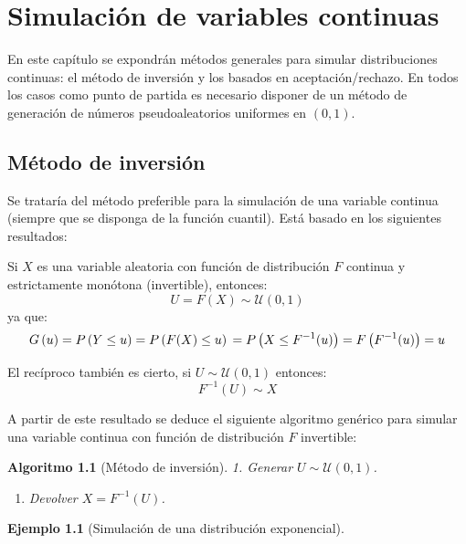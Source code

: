 \documentclass[
]{book}
\providecommand{\tightlist}{%
  \setlength{\itemsep}{0pt}\setlength{\parskip}{0pt}}
\theoremstyle{break}
\newtheorem{conjecture}{Algoritmo}[chapter]
\theoremstyle{definition}
\theoremstyle{definition}
\newtheorem{example}{Ejemplo}[chapter]
\theoremstyle{definition}
\theoremstyle{definition}
\theoremstyle{remark}
\begin{document}
\hypertarget{sim-con}{%
\chapter{Simulación de variables continuas}\label{sim-con}}

En este capítulo se expondrán métodos generales para simular distribuciones continuas: el método de inversión y los basados en aceptación/rechazo.
En todos los casos como punto de partida es necesario
disponer de un método de generación de números pseudoaleatorios uniformes en \((0,1)\).

\hypertarget{muxe9todo-de-inversiuxf3n}{%
\section{Método de inversión}\label{muxe9todo-de-inversiuxf3n}}

Se trataría del método preferible para la simulación de una variable continua (siempre que se disponga de la función cuantil).
Está basado en los siguientes resultados:

Si \(X\) es una variable aleatoria con función de distribución \(F\) continua y estrictamente monótona
(invertible), entonces:
\[U=F\left( X \right) \sim \mathcal{U}(0, 1)\]
ya que:
\[G\left( u \right) = P\left( Y \leq u \right) 
= P\left( F(X) \leq u \right) \\
= P\left( X \leq F^{-1}(u) \right) 
= F\left( F^{-1}(u) \right) = u\]

El recíproco también es cierto, si \(U \sim \mathcal{U}(0, 1)\) entonces:
\[F^{-1}\left( U \right) \sim X\]

A partir de este resultado se deduce el siguiente algoritmo genérico para simular una variable continua con función de distribución \(F\) invertible:

\begin{conjecture}[Método de inversión]
\protect\hypertarget{cnj:inversion}{}{\label{cnj:inversion} {} }
1. Generar \(U \sim \mathcal{U}(0, 1)\).

\begin{enumerate}
\def\labelenumi{\arabic{enumi}.}
\setcounter{enumi}{1}
\tightlist
\item
  Devolver \(X = F^{-1}\left( U \right)\).
\end{enumerate}
\end{conjecture}

\begin{example}[Simulación de una distribución exponencial]
\protect\hypertarget{exm:exp-inv}{}{\label{exm:exp-inv} {} }
\end{example}
\end{document}
